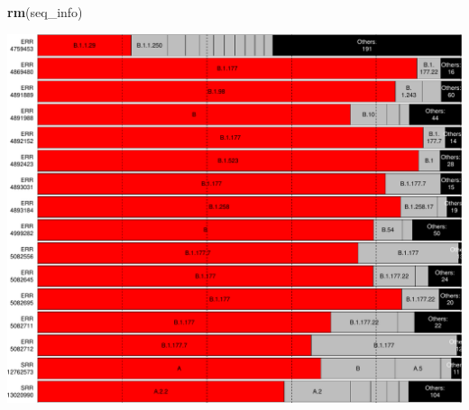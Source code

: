 \documentclass[
]{article}
\newenvironment{Shaded}{\begin{snugshade}}{\end{snugshade}}
\newcommand{\KeywordTok}[1]{\textcolor[rgb]{0.13,0.29,0.53}{\textbf{#1}}}
\newcommand{\NormalTok}[1]{#1}
\begin{document}
\begin{Shaded}
\begin{Highlighting}[]
\KeywordTok{rm}\NormalTok{(seq\_info)}
\end{Highlighting}
\end{Shaded}

\includegraphics{pangolin_results_report_d_files/figure-latex/pareto-1.pdf}
\end{document}
